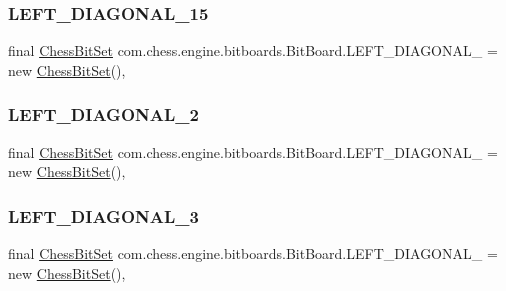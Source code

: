 \subsubsection{\texorpdfstring{LEFT\_DIAGONAL\_15}{LEFT\_DIAGONAL\_15}}
{\footnotesize\ttfamily final \mbox{\hyperlink{classcom_1_1chess_1_1engine_1_1bitboards_1_1_chess_bit_set}{Chess\+Bit\+Set}} com.\+chess.\+engine.\+bitboards.\+Bit\+Board.\+L\+E\+F\+T\+\_\+\+D\+I\+A\+G\+O\+N\+A\+L\+\_ = new \mbox{\hyperlink{classcom_1_1chess_1_1engine_1_1bitboards_1_1_chess_bit_set}{Chess\+Bit\+Set}}()\hspace{0.3cm}{\ttfamily [static]}, {\ttfamily [package]}}

\mbox{\label{classcom_1_1chess_1_1engine_1_1bitboards_1_1_bit_board_ad7a2bd4c87af28df3e51158b32bd8636}} 
\subsubsection{\texorpdfstring{LEFT\_DIAGONAL\_2}{LEFT\_DIAGONAL\_2}}
{\footnotesize\ttfamily final \mbox{\hyperlink{classcom_1_1chess_1_1engine_1_1bitboards_1_1_chess_bit_set}{Chess\+Bit\+Set}} com.\+chess.\+engine.\+bitboards.\+Bit\+Board.\+L\+E\+F\+T\+\_\+\+D\+I\+A\+G\+O\+N\+A\+L\+\_ = new \mbox{\hyperlink{classcom_1_1chess_1_1engine_1_1bitboards_1_1_chess_bit_set}{Chess\+Bit\+Set}}()\hspace{0.3cm}{\ttfamily [static]}, {\ttfamily [package]}}

\mbox{\label{classcom_1_1chess_1_1engine_1_1bitboards_1_1_bit_board_a5bfc2adb2f82f22b0c41603e04e38941}} 
\subsubsection{\texorpdfstring{LEFT\_DIAGONAL\_3}{LEFT\_DIAGONAL\_3}}
{\footnotesize\ttfamily final \mbox{\hyperlink{classcom_1_1chess_1_1engine_1_1bitboards_1_1_chess_bit_set}{Chess\+Bit\+Set}} com.\+chess.\+engine.\+bitboards.\+Bit\+Board.\+L\+E\+F\+T\+\_\+\+D\+I\+A\+G\+O\+N\+A\+L\+\_ = new \mbox{\hyperlink{classcom_1_1chess_1_1engine_1_1bitboards_1_1_chess_bit_set}{Chess\+Bit\+Set}}()\hspace{0.3cm}{\ttfamily [static]}, {\ttfamily [package]}}

